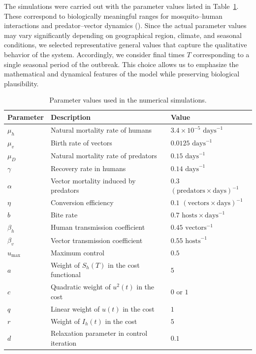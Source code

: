 \documentclass{amsart}
\theoremstyle{definition}
\theoremstyle{remark}
\numberwithin{equation}{section}
\begin{document}
The simulations were carried out with the parameter values listed in Table~\ref{tab:params}.  
These correspond to biologically meaningful ranges for mosquito–human interactions and predator–vector dynamics (\cite{Massad2010,Antunes-aronna,Lotka1978}). 
Since the actual parameter values may vary significantly depending on geographical region, climate, and seasonal conditions, we selected representative general values that capture the qualitative behavior of the system.  Accordingly, we consider final times 
$T$ corresponding to a single seasonal period of the outbreak.
This choice allows us to emphasize the mathematical and dynamical features of the model while preserving biological plausibility.

\begin{table}[ht]
	\centering
	\caption{Parameter values used in the numerical simulations.}
	\label{tab:params}
	\begin{tabular}{lll}
		\hline
		\textbf{Parameter} & \textbf{Description} & \textbf{Value}\\ \hline
		$\mu_h$ & Natural mortality rate of humans & $3.4\times 10^{-5}$ $\text{days}^{-1}$ \\
		$\mu_v$ & Birth rate of vectors & $0.0125$  $\text{days}^{-1}$\\
		$\mu_D$ & Natural mortality rate of predators & $0.15$  $\text{days}^{-1}$\\
		$\gamma$ & Recovery rate in humans & $0.14$ $\text{days}^{-1}$\\
		$\alpha$ & Vector mortality induced by predators & $0.3$ $(\text{predators}\times \text{days})^{-1}$ \\
		$\eta$ & Conversion efficiency & $0.1$  $(\text{vectors}\times \text{days})^{-1}$ \\
		$b$ & Bite rate & $0.7$ $\text{hosts}\times \text{days}^{-1}$\\
		$\beta_h$ & Human transmission coefficient & $0.45$ $\text{vectors}^{-1}$ \\
		$\beta_v$ & Vector transmission coefficient & $0.55$ $\text{hosts}^{-1}$ \\
		$u_{\max}$ & Maximum control & $0.5$ \\ \hline
		$a$ & Weight of $S_h(T)$ in the cost functional & $5$ \\
		$c$ & Quadratic weight of $u^2(t)$ in the cost & $0$  or $ 1$ \\
		$q$ & Linear weight of $u(t)$ in the cost & $1$ \\
		$r$ & Weight of $I_h(t)$ in the cost & $5$ \\
		$d$ & Relaxation parameter in control iteration & $0.1$\\ \hline
	\end{tabular}
\end{table}
\end{document}
